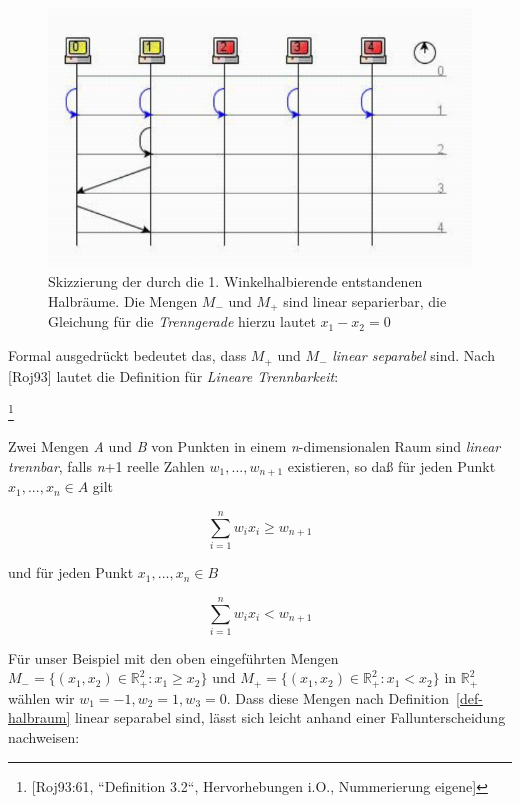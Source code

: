\begin{figure}[h]
    \centering
    \includegraphics{images/p1ReadSeq.pdf}
    \caption{Skizzierung der durch die 1. Winkelhalbierende entstandenen Halbräume. Die Mengen $M_-$ und $M_+$ sind linear separierbar, die Gleichung für die \textit{Trenngerade} hierzu lautet $x_1 - x_2 = 0$}
    \label{fig-halbraeume}
\end{figure}

Formal ausgedrückt bedeutet das, dass $M_+$ und $M_-$ \textit{linear separabel} sind. Nach [Roj93] lautet die Definition für \textit{Lineare Trennbarkeit}:

\begin{definition}\footnote{
    [Roj93:61, ``Definition 3.2``, Hervorhebungen i.O., Nummerierung eigene]
}

Zwei Mengen \textit{A} und \textit{B} von Punkten in einem \textit{n}-dimensionalen Raum sind \textit{linear trennbar}, falls \textit{n}+1 reelle Zahlen $w_1, ... , w_{n+1}$ existieren, so daß für jeden Punkt $x_1, ... , x_n \in A$ gilt

\begin{equation}
\sum^n_{i=1} w_ix_i \geq w_{n+1}
\label{eq:gl-defhalbraum-gl1}
\end{equation}

und für jeden Punkt $x_1, ... , x_n \in B$

\begin{equation}
    \sum^n_{i=1} w_ix_i < w_{n+1}
\label{eq:gl-defhalbraum-gl2}
\end{equation}
\label{def-halbraum}
\end{definition}


\noindent
Für unser Beispiel mit den oben eingeführten Mengen $M_- = \{(x_1, x_2) \in  \mathbb{R}_+^2: x_1 \geq x_2\}$ und $M_+=\{(x_1, x_2) \in  \mathbb{R}_+^2: x_1 < x_2\}$ in $ \mathbb{R}_+^2$ wählen wir $w_1 = -1, w_2 = 1, w_3 = 0$.
Dass diese Mengen nach Definition~\ref{def-halbraum} linear separabel sind, lässt sich leicht anhand einer Fallunterscheidung nachweisen:

